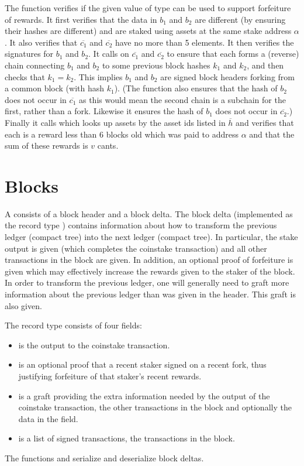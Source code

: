 The function {} verifies if the given value of type {}
can be used to support forfeiture of rewards. It first verifies that the data in $b_1$ and $b_2$
are different (by ensuring their hashes are different)
and
are staked using assets at the same stake address $\alpha$.
It also verifies that $\overline{c_1}$
and $\overline{c_2}$ have no more than 5 elements.
It then verifies the signatures for $b_1$ and $b_2$.
It calls {} on $\overline{c_1}$ and $\overline{c_2}$
to ensure that each forms a (reverse) chain connecting $b_1$ and $b_2$
to some previous block hashes $k_1$ and $k_2$,
and then checks that $k_1 = k_2$. This implies $b_1$ and $b_2$ are signed block headers
forking from a common block (with hash $k_1$). (The function {} also ensures
that the hash of $b_2$ does not occur in $\overline{c_1}$ as this would mean
the second chain is a subchain for the first, rather than a fork. Likewise it ensures
the hash of $b_1$ does not occur in $\overline{c_2}$.)
Finally it calls {}
which looks up assets by the asset ids listed in $\overline{h}$
and verifies that each is a reward less than 6 blocks old
which was paid to address $\alpha$
and that the sum of these rewards is $v$ cants.

\section{Blocks}

A {} consists of a block header and a block delta.
The block delta (implemented as the record type {})
contains information about how to transform the previous ledger (compact tree)
into the next ledger (compact tree).
In particular, the stake output is given (which completes the coinstake transaction)
and all other transactions in the block are given.
In addition, an optional proof of forfeiture is given which may effectively increase
the rewards given to the staker of the block.
In order to transform the previous ledger,
one will generally need to graft more information about the previous
ledger than was given in the header.
This graft is also given.

The {} record type consists of four fields:
\begin{itemize}
\item {} is the output to the coinstake transaction.
\item {} is an optional proof that a recent staker signed on a recent fork, thus
justifying forfeiture of that staker's recent rewards.
\item {} is a graft providing the extra information needed by the output of the coinstake transaction, the other transactions in the block and optionally the data in the {} field.
\item {} is a list of signed transactions, the transactions in the block.
\end{itemize}
The functions {} and {} serialize
and deserialize block deltas.

